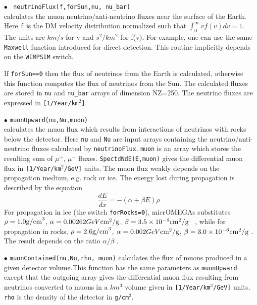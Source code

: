 \documentclass[12pt,a4paper]{article}
\begin{document}
  
\noindent
$\bullet$ \verb| neutrinoFlux(f,forSun,nu, nu_bar)|\\
calculates the muon neutrino/anti-neutrino  fluxes  near the surface of the Earth. 
Here  \verb|f|  is  the DM velocity distribution   normalized such that 
$ \int_0^{\infty} v f(v) dv =1$. The units  are $km/s$ for v and $s^2/km^2$ for  
f(v).  For example,   one can use the same  \verb|Maxwell| 
function introduced for direct detection.  This routine implicitly depends on the {\tt WIMPSIM} switch.
  
  If {\tt forSun==0} then the flux of neutrinos from the Earth is calculated, otherwise this function computes the flux of neutrinos from the Sun.  The calculated fluxes are stored in {\tt nu} and {\tt nu\_bar}  arrays of dimension NZ=250.  
The neutrino fluxes are expressed in \verb|[1/Year/km|$^2$\verb|]|.

\noindent
$\bullet$ \verb|muonUpward(nu,Nu,muon)|\\
calculates the muon flux which results from interactions of
neutrinos with rocks below the detector. Here  {\tt nu} and {\tt Nu} are input arrays containing the
neutrino/anti-neutrino fluxes calculated by {\tt neutrinoFlux}. {\tt muon} is an
array which stores the resulting sum of $\mu^+$, $\mu^-$ fluxes. {\tt SpectdNdE(E,muon)}  gives the
differential muon flux  in \verb|[1/Year/km|$^2$\verb|/GeV]| units.  
The muon flux weakly depends on the propagation medium, e.g. rock or ice. The energy lost during
propagation is described by  the equation  \cite{Erkoca:2009by}
\begin{equation}
\frac{dE}{dx}=-(\alpha +\beta E)\rho 
\end{equation}
For propagation in ice (the switch {\tt forRocks=0}),
 micrOMEGAs substitutes 
$\rho= 1.0{\rm g/cm}^3$, $\alpha=0.00262 GeV {\rm cm}^2/{\rm g}$,  $\beta=3.5\times 10^{-6} {\rm cm}^2/{\rm g}$ ~\cite{Chirkin:2004hz}, while
for propagation in rocks, 
$\rho= 2.6{\rm g/cm}^3$, $\alpha=0.002 GeV {\rm cm}^2/{\rm g}$,  $\beta=3.0\times 10^{-6} {\rm cm}^2/{\rm g}$ \cite{Erkoca:2009by}. 
The result depends on the ratio $\alpha/\beta$ .

\noindent $\bullet$ \verb|muonContained(nu,Nu,rho, muon)|
calculates  the flux  of muons  produced in a given detector volume.This function  has the same parameters as \verb|muonUpward| 
except that the  outgoing  array gives the differential muon flux resulting from neutrinos converted to muons 
in a  $km^3$ volume given  in \verb|[1/Year/km|$^3$\verb|/GeV]| units.  \verb|rho| is the density of the detector in 
\verb|g/cm|$^3$.\\
\end{document}
